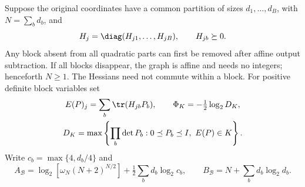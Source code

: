 Suppose the original coordinates have a common partition of sizes
$d_1,\ldots,d_B$, with $N=\sum_bd_b$, and
\[
 H_j=\diag(H_{j1},\ldots,H_{jB}),\qquad H_{jb}\succeq0.
\]
Any block absent from all quadratic parts can first be removed after
affine output subtraction. If all blocks disappear, the graph is affine
and needs no integers; henceforth $N\ge1$. The Hessians need not commute
within a block. For positive definite block variables set
\[
 \begin{gathered}
 E(P)_j=\sum_b\tr(H_{jb}P_b),\qquad
 \Phi_K=-\tfrac12\log_2D_K,\\
 D_K=\max\left\{\prod_b\det P_b:0\preceq P_b\preceq I,\ E(P)\in K\right\}.
 \end{gathered}
\]
Write $c_b=\max\{4,d_b/4\}$ and
\begin{equation}\label{eq:block-constants}
 A_{\mathcal B}=\log_2[\omega_N(N+2)^{N/2}]
                  +\tfrac12\sum_bd_b\log_2c_b,
 \qquad B_{\mathcal B}=N+\sum_bd_b\log_2d_b.
\end{equation}

